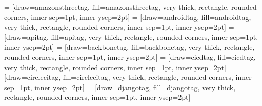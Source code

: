  = [draw=amazonsthreetag, fill=amazonsthreetag, very thick, rectangle, rounded corners, inner sep=1pt, inner ysep=2pt]
\newcommand{\amazonsthreetag}{\begin{tikzpicture}\node [amazonsthreetag] (box){{\scriptsize \color{white}{\textbf{\phantom{|}Amazon S3\phantom{|}}}}};\end{tikzpicture}}
 = [draw=androidtag, fill=androidtag, very thick, rectangle, rounded corners, inner sep=1pt, inner ysep=2pt]
\newcommand{\androidtag}{\begin{tikzpicture}\node [androidtag] (box){{\scriptsize \textbf{\phantom{|}Android\phantom{|}}}};\end{tikzpicture}}
 = [draw=apitag, fill=apitag, very thick, rectangle, rounded corners, inner sep=1pt, inner ysep=2pt]
\newcommand{\apitag}{\begin{tikzpicture}\node [apitag] (box){{\scriptsize \textbf{\phantom{|}API\phantom{|}}}};\end{tikzpicture}}
 = [draw=backbonetag, fill=backbonetag, very thick, rectangle, rounded corners, inner sep=1pt, inner ysep=2pt]
\newcommand{\backbonetag}{\begin{tikzpicture}\node [backbonetag] (box){{\scriptsize \color{white}{\textbf{\phantom{|}BackboneJS\phantom{|}}}}};\end{tikzpicture}}
 = [draw=cicdtag, fill=cicdtag, very thick, rectangle, rounded corners, inner sep=1pt, inner ysep=2pt]
\newcommand{\cicdtag}{\begin{tikzpicture}\node [cicdtag] (box){{\scriptsize \textbf{\phantom{|}CI/CD\phantom{|}}}};\end{tikzpicture}}
 = [draw=circlecitag, fill=circlecitag, very thick, rectangle, rounded corners, inner sep=1pt, inner ysep=2pt]
\newcommand{\circlecitag}{\begin{tikzpicture}\node [circlecitag] (box){{\scriptsize \textbf{\phantom{|}CircleCI\phantom{|}}}};\end{tikzpicture}}
 = [draw=djangotag, fill=djangotag, very thick, rectangle, rounded corners, inner sep=1pt, inner ysep=2pt]
\newcommand{\djangotag}{\begin{tikzpicture}\node [djangotag] (box){{\scriptsize \color{white}{\textbf{\phantom{|}Django\phantom{|}}}}};\end{tikzpicture}}
